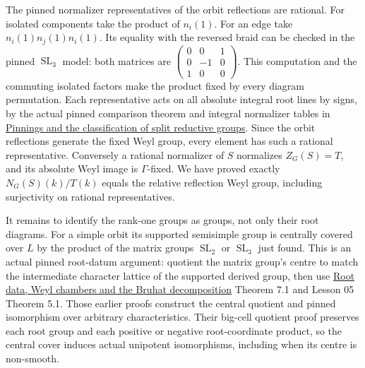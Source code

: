 \documentclass[
  11pt,
]{article}
\begin{document}
The pinned normalizer representatives of the orbit reflections are
rational. For isolated components take the product of \(n_i(1)\). For an
edge take \(n_i(1)n_j(1)n_i(1)\). Its equality with the reversed braid
can be checked in the pinned \(\operatorname{SL}_3\) model: both
matrices are \(\begin{pmatrix}0&0&1\\0&-1&0\\1&0&0\end{pmatrix}\). This
computation and the commuting isolated factors make the product fixed by
every diagram permutation. Each representative acts on all absolute
integral root lines by signs, by the actual pinned comparison theorem
and integral normalizer tables in \href{../AG-RG/AG-RG-05.html}{Pinnings
and the classification of split reductive groups}. Since the orbit
reflections generate the fixed Weyl group, every element has such a
rational representative. Conversely a rational normalizer of \(S\)
normalizes \(Z_G(S)=T\), and its absolute Weyl image is
\(\Gamma\)-fixed. We have proved exactly \(N_G(S)(k)/T(k)\) equals the
relative reflection Weyl group, including surjectivity on rational
representatives.

It remains to identify the rank-one groups as groups, not only their
root diagrams. For a simple orbit its supported semisimple group is
centrally covered over \(L\) by the product of the matrix groups
\(\operatorname{SL}_2\) or \(\operatorname{SL}_3\) just found. This is
an actual pinned root-datum argument: quotient the matrix group's centre
to match the intermediate character lattice of the supported derived
group, then use \href{../AG-RG/AG-RG-04.html}{Root data, Weyl chambers
and the Bruhat decomposition} Theorem 7.1 and Lesson 05 Theorem 5.1.
Those earlier proofs construct the central quotient and pinned
isomorphism over arbitrary characteristics. Their big-cell quotient
proof preserves each root group and each positive or negative
root-coordinate product, so the central cover induces actual unipotent
isomorphisms, including when its centre is non-smooth.
\end{document}
